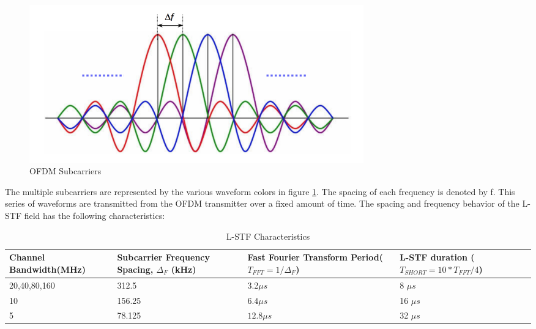 \begin{figure}[ht!]
	\centering
	\includegraphics[width=0.70\textwidth]{img/ofdm-subcarriers}
	\caption{OFDM Subcarriers}
	\label{fig:ofdm_subcarriers}
\end{figure}\par
The multiple subcarriers are represented by the various waveform colors in figure \ref{fig:ofdm_subcarriers}.  The spacing of each frequency is denoted by f.  This series of waveforms are transmitted from the OFDM transmitter over a fixed amount of time. The spacing and frequency behavior of the L-STF field has the following characteristics: \par
\begin{table}[ht!]
	\centering
\begin{tabular}{|p{3.6cm}|p{4cm}|p{4cm}|p{4.5cm}|}
	\hline
	Channel Bandwidth\newline(MHz) & Subcarrier Frequency Spacing, $\Delta_F$ (kHz) &Fast Fourier Transform Period\newline($T_{FFT}=1/\Delta_F$)& L-STF duration \newline($T_{SHORT}=10*T_{FFT}/4$) \\
	\hline
	20,40,80,160 & 312.5 &3.2$\mu s$ &8 $\mu s$ \\
	10 & 156.25 &$6.4\mu s$ &16 $\mu s $\\
	5 & 78.125 &$12.8\mu s$ &32 $\mu s$  \\
	\hline
\end{tabular} 
	\caption{L-STF Characteristics}
	\label{table:spacing}
\end{table} \par 
	
